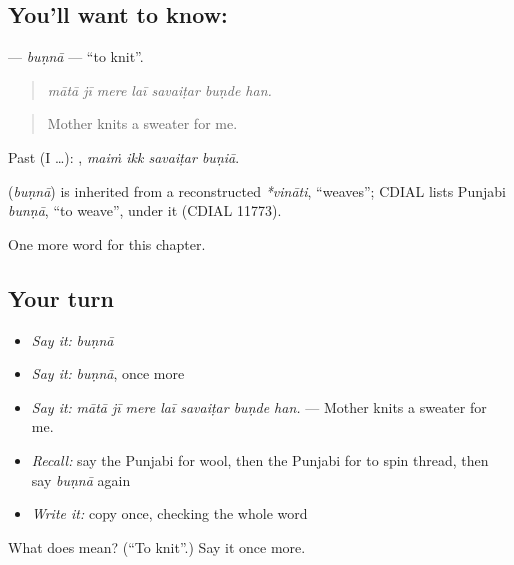 \subsection*{You'll want to know: }
\textbf{} — \emph{buṇnā} — \textquotedblleft{}to knit\textquotedblright{}.

\begin{quote}
      
\end{quote}

\begin{quote}
\emph{mātā jī mere laī savaiṭar buṇde han.}
\end{quote}

\begin{quote}
Mother knits a sweater for me.
\end{quote}

Past (I …):    , \emph{maiṁ ikk savaiṭar buṇiā}.

\begin{cousinweb}
\textbf{} (\emph{buṇnā}) is inherited from a reconstructed \emph{*vināti}, \textquotedblleft{}weaves\textquotedblright{}; CDIAL lists Punjabi \emph{bunṇā}, \textquotedblleft{}to weave\textquotedblright{}, under it (CDIAL 11773).
\end{cousinweb}

\begin{grammarlens}[title={What you've built}]
One more word for this chapter.
\end{grammarlens}

\subsection*{Your turn}
\begin{itemize}
\raggedright
  \item \emph{Say it:} \emph{buṇnā}
  \item \emph{Say it:} \emph{buṇnā}, once more
  \item \emph{Say it:} \emph{mātā jī mere laī savaiṭar buṇde han.} — Mother knits a sweater for me.
  \item \emph{Recall:} say the Punjabi for wool, then the Punjabi for to spin thread, then say \emph{buṇnā} again
  \item \emph{Write it:} copy \textbf{} once, checking the whole word
\end{itemize}

\begin{tcolorbox}[breakable,colback=teal!4,colframe=teal!35!black,title={Before you move on}]
What does  mean? (\textquotedblleft{}To knit\textquotedblright{}.) Say it once more.
\end{tcolorbox}
